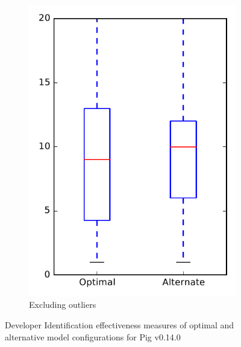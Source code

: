 \begin{figure}
\begin{subfigure}{.4\textwidth}
        \includegraphics[height=0.4\textheight]{figures/combo/dit_rq1_pig_no_outlier}
        \caption{Excluding outliers}\label{fig:combo:dit:rq1:pig_no_outlier}
    \end{subfigure}
\caption{Developer Identification effectiveness measures of optimal and alternative model configurations for Pig v0.14.0}
\label{fig:combo:dit:rq1:pig}
\end{figure}
